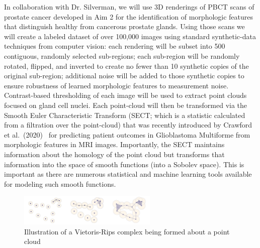 \documentclass{NIHGrant}
\theoremstyle{theorem}
\begin{document}
In collaboration with Dr. Silverman, we will use 3D renderings of PBCT scans of prostate cancer developed in Aim 2 for the identification of morphologic features that distinguish healthy from cancerous prostate glands. Using those scans we will create a labeled dataset of over 100,000 images using standard synthetic-data techniques from computer vision: each rendering will be subset into 500 contiguous, randomly selected sub-regions; each sub-region will be randomly rotated, flipped, and inverted to create no fewer than 10 synthetic copies of the original sub-region; additional noise will be added to those synthetic copies to ensure robustness of learned morphologic features to measurement noise. Contrast-based thresholding of each image will be used to extract point clouds focused on gland cell nuclei. Each point-cloud will then be transformed via the Smooth Euler Characteristic Transform (SECT; which is a statistic calculated from a filtration over the point-cloud) that was recently introduced by Crawford et al.~(2020)~\cite{crawford_predicting_2020} for predicting patient outcomes in Glioblastoma Multiforme from morphologic features in MRI images. Importantly, the SECT maintains information about the homology of the point cloud but transforms that information into the space of smooth functions (into a Sobolev space). This is important as there are numerous statistical and machine learning tools available for modeling such smooth functions.

\begin{figure}
  \vspace{-.3cm} \includegraphics[width=0.59\textwidth]{ ./figures/vr.png }
  \caption{Illustration of a Vietoris-Rips complex being formed about a point cloud}\label{fig:setup}
\end{figure}
\end{document}
